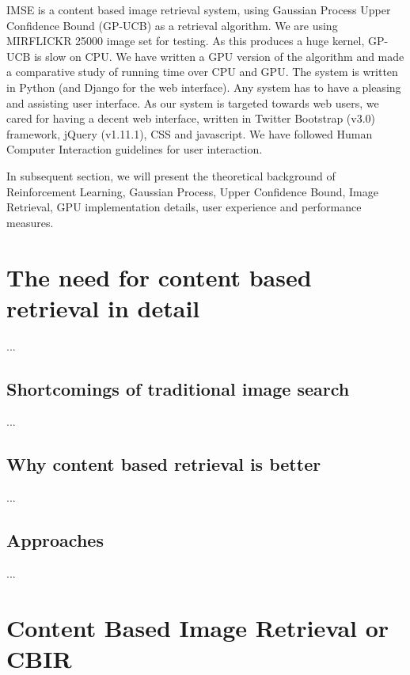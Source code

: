 \documentclass[english]{tktltiki}
\begin{document}
IMSE is a content based image retrieval system, using Gaussian Process Upper Confidence Bound (GP-UCB) as a retrieval algorithm. We are using MIRFLICKR 25000 \cite{mirflickr} image set for testing. As this produces a huge kernel, GP-UCB is slow on CPU. We have written a GPU version of the algorithm and made a comparative study of running time over CPU and GPU. The system is written in Python (and Django for the web interface). Any system has to have a pleasing and assisting user interface. As our system is targeted towards web users, we cared for having a decent web interface, written in Twitter Bootstrap (v3.0) framework, jQuery (v1.11.1), CSS and javascript. We have followed Human Computer Interaction guidelines for user interaction.

In subsequent section, we will present the theoretical background of Reinforcement Learning, Gaussian Process, Upper Confidence Bound, Image Retrieval, GPU implementation details, user experience and performance measures.


\section{The need for content based retrieval in detail}

...

\subsection{Shortcomings of traditional image search}

...

\subsection{Why content based retrieval is better}


...


\subsection{Approaches}

...

\fi


\section{Content Based Image Retrieval or CBIR}
\end{document}
